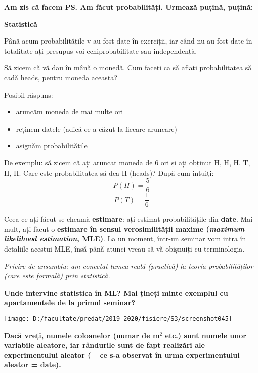 \documentclass[12pt]{article}
\begin{document}
	\newpage
	
	\textbf{\large{Am zis că facem PS. Am făcut probabilități. Urmează puțină, puțină:}}
	
	\textbf{\large{Statistică}}
	
	Până acum probabilitățile v-au fost date în exerciții, iar când nu au fost date în totalitate ați presupus voi echiprobabilitate sau independență.
	
	Să zicem că vă dau în mână o monedă. Cum faceți ca să aflați probabilitatea să cadă heads, pentru moneda aceasta?
	
	Posibil răspuns: 
	\begin{itemize}
		\item aruncăm moneda de mai multe ori
		\item reținem datele (adică ce a căzut la fiecare aruncare)
		\item asignăm probabilitățile
	\end{itemize}
	
	De exemplu: să zicem că ați aruncat moneda de 6 ori și ați obținut H, H, H, T, H, H. Care este probabilitatea să dea H (heads)? După cum intuiți:
	$$P(H) = \frac{5}{6}$$
	$$P(T) = \frac{1}{6}$$
	
	Ceea ce ați făcut se cheamă \textbf{estimare}: ați estimat probabilitățile din \textbf{date}. Mai mult, ați făcut o \textbf{estimare în sensul verosimilității maxime (\textit{maximum likelihood estimation}, MLE)}. La un moment, într-un seminar vom intra în detaliile acestui MLE, însă până atunci vreau să vă obișnuiți cu terminologia.
	
	\textit{Privire de ansamblu: am conectat lumea reală (practică) la teoria probabilităților (care este formală) prin statistică.}
	
	\textbf{Unde intervine statistica în ML? Mai țineți minte exemplul cu apartamentele de la primul seminar? }
	
	\begin{center}
		\texttt{[image: D:/facultate/predat/2019-2020/fisiere/S3/screenshot045]}
	\end{center}
	\textbf{Dacă vreți, numele coloanelor (numar de m$^2$ etc.) sunt numele unor variabile aleatore, iar rândurile sunt de fapt realizări ale experimentului aleator (= ce s-a observat în urma experimentului aleator = date).}
	\\
	
\end{document}
